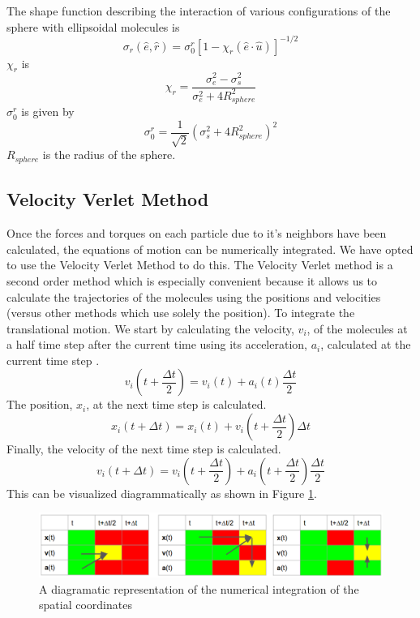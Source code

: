 \documentclass[preprint, aps]{revtex4-1}
\begin{document}
The shape function describing the interaction of various configurations of the
sphere with ellipsoidal molecules is
	\begin{equation}
		\sigma_r(\hat{e}, \hat{r}) =
		\sigma_0^r\left[1-\chi_r(\hat{e} \cdot \hat{u})\right]^{-1/2}
	\end{equation}
$\chi_r$ is
	\begin{equation}
		\chi_r = 
		\frac{
			\sigma_e^2 - \sigma_s^2
		}
		{
			\sigma_e^2 + 4R_{sphere}^2
		}
	\end{equation}
$\sigma_0^r$ is given by
	\begin{equation}
		\sigma_0^r 
		= \frac{1}{\sqrt{2}}\left( \sigma_s^2 + 4R_{sphere}^2 \right)^2
	\end{equation}
	$R_{sphere}$ is the radius of the sphere. 

\subsection*{Velocity Verlet Method}
Once the forces and torques on each particle due to it's neighbors have been
calculated, the equations of motion can be numerically integrated. We have opted
to use the Velocity Verlet Method to do this. The Velocity Verlet method is a
second order method which is especially convenient because it allows us to
calculate the trajectories of the molecules using the positions and velocities
(versus other methods which use solely the position). To integrate the
translational motion. We start by calculating the velocity, $v_i$, of the
molecules at a half time step after the current time using its acceleration,
$a_i$, calculated at the current time step . 
	\begin{equation} \label{vv-v1}
		v_i(t+\frac{\Delta t}{2}) 
		= v_i(t) + a_i(t)\frac{\Delta t}{2}
	\end{equation}
The position, $x_i$, at the next time step is calculated.
	\begin{equation} \label{vv-x}
		x_i(t+\Delta t) 
		= x_i(t) + v_i(t+\frac{\Delta t}{2})\Delta t
	\end{equation}
Finally, the velocity of the next time step is calculated.
	\begin{equation} \label{vv-v2}
		v_i(t+\Delta t) 
		= v_i(t + \frac{\Delta t}{2}) 
		+ a_i(t + \frac{\Delta t}{2})\frac{\Delta t}{2}
	\end{equation}
This can be visualized diagrammatically as shown in Figure \ref{fig:vv}.
	\begin{figure}[H]
		\includegraphics[width=\textwidth]{vv.png}
		\caption{A diagramatic representation of the numerical integration of
			the spatial coordinates}
		\label{fig:vv}
	\end{figure}
\end{document}
